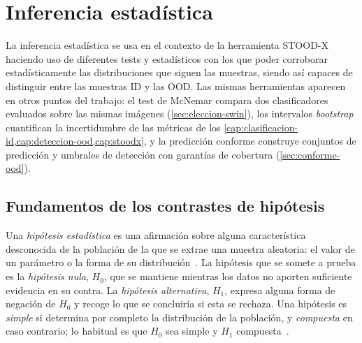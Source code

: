 %

\chapter{Inferencia estadística}\label{cap:inferencia}

La inferencia estadística se usa en el contexto de la herramienta STOOD-X haciendo uso de diferentes tests y estadísticos con los que poder corroborar estadísticamente las distribuciones que siguen las muestras, siendo así capaces de distinguir entre las muestras ID y las OOD. Las mismas herramientas aparecen en otros puntos del trabajo: el test de McNemar compara dos clasificadores evaluados sobre las mismas imágenes (\cref{sec:eleccion-swin}), los intervalos \emph{bootstrap} cuantifican la incertidumbre de las métricas de los \cref{cap:clasificacion-id,cap:deteccion-ood,cap:stoodx}, y la predicción conforme construye conjuntos de predicción y umbrales de detección con garantías de cobertura (\cref{sec:conforme-ood}).

\section{Fundamentos de los contrastes de hipótesis}\label{sec:contrastes}

Una \emph{hipótesis estadística} es una afirmación sobre alguna característica desconocida de la población de la que se extrae una muestra aleatoria: el valor de un parámetro o la forma de su distribución~\cite[sec.~9.1]{canavos2003}. La hipótesis que se somete a prueba es la \emph{hipótesis nula}, $H_0$, que se mantiene mientras los datos no aporten suficiente evidencia en su contra. La \emph{hipótesis alternativa}, $H_1$, expresa alguna forma de negación de $H_0$ y recoge lo que se concluiría si esta se rechaza. Una hipótesis es \emph{simple} si determina por completo la distribución de la población, y \emph{compuesta} en caso contrario; lo habitual es que $H_0$ sea simple y $H_1$ compuesta~\cite[sec.~9.2]{canavos2003}.

